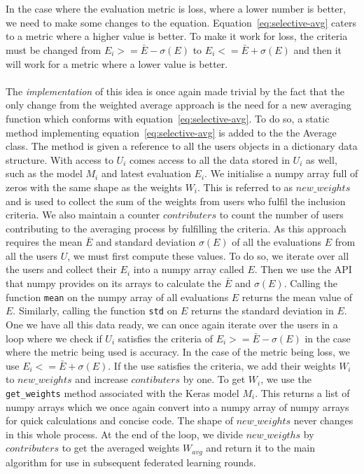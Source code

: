 \documentclass[12pt]{article}
\begin{document}
\\\\
In the case where the evaluation metric is loss, where a lower number is better, we need to make some changes to the equation. Equation~\ref{eq:selective-avg} caters to a metric where a higher value is better. To make it work for loss, the criteria must be changed from $E_i >= \bar{E}-\sigma(E)$ to $E_i <= \bar{E}+\sigma(E)$ and then it will work for a metric where a lower value is better.
\\\\
The \textit{implementation} of this idea is once again made trivial by the fact that the only change from the weighted average approach is the need for a new averaging function which conforms with equation~\ref{eq:selective-avg}. To do so, a static method implementing equation~\ref{eq:selective-avg} is added to the the Average class. The method is given a reference to all the users objects in a dictionary data structure. With access to $U_i$ comes access to all the data stored in $U_i$ as well, such as the model $M_i$ and latest evaluation $E_i$. We initialise a numpy array full of zeros with the same shape as the weights $W_i$. This is referred to as $new\_weights$ and is used to collect the sum of the weights from users who fulfil the inclusion criteria. We also maintain a counter $contributers$ to count the number of users contributing to the averaging process by fulfilling the criteria. As this approach requires the mean $\bar{E}$ and standard deviation $\sigma(E)$ of all the evaluations $E$ from all the users $U$, we must first compute these values. To do so, we iterate over all the users and collect their $E_i$ into a numpy array called $E$. Then we use the API that numpy provides on its arrays to calculate the $\bar{E}$ and $\sigma(E)$. Calling the function \texttt{mean} on the numpy array of all evaluations $E$ returns the mean value of $E$. Similarly, calling the function \texttt{std} on $E$ returns the standard deviation in $E$. One we have all this data ready, we can once again iterate over the users in a loop where we check if $U_i$ satisfies the criteria of $E_i >= \bar{E}-\sigma(E)$ in the case where the metric being used is accuracy. In the case of the metric being loss, we use $E_i <= \bar{E}+\sigma(E)$. If the use satisfies the criteria, we add their weights $W_i$ to $new\_weights$ and increase $contibuters$ by one. To get $W_i$, we use the \texttt{get\_weights} method associated with the Keras model $M_i$. This returns a list of numpy arrays which we once again convert into a numpy array of numpy arrays for quick calculations and concise code. The shape of $new\_weights$ never changes in this whole process. At the end of the loop, we divide $new\_weigths$ by $contributers$ to get the averaged weights $W_{avg}$ and return it to the main algorithm for use in subsequent federated learning rounds. 
\end{document}
